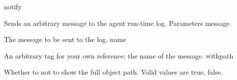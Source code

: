 notify

Sends an arbitrary message to the agent run-time log.
Parameters
message

The message to be sent to the log.
name

An arbitrary tag for your own reference; the name of the message.
withpath

Whether to not to show the full object path. Valid values are true, false.
